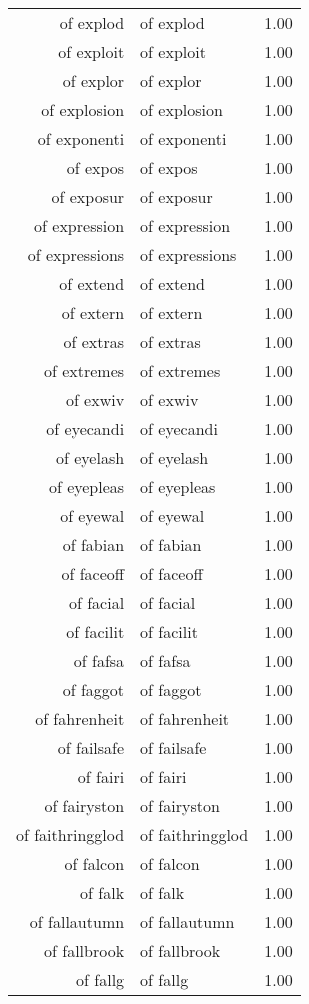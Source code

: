 \begin{table}[ht]
\begin{tabular}{rlr}
  of explod & of explod & 1.00 \\ 
  of exploit & of exploit & 1.00 \\ 
  of explor & of explor & 1.00 \\ 
  of explosion & of explosion & 1.00 \\ 
  of exponenti & of exponenti & 1.00 \\ 
  of expos & of expos & 1.00 \\ 
  of exposur & of exposur & 1.00 \\ 
  of expression & of expression & 1.00 \\ 
  of expressions & of expressions & 1.00 \\ 
  of extend & of extend & 1.00 \\ 
  of extern & of extern & 1.00 \\ 
  of extras & of extras & 1.00 \\ 
  of extremes & of extremes & 1.00 \\ 
  of exwiv & of exwiv & 1.00 \\ 
  of eyecandi & of eyecandi & 1.00 \\ 
  of eyelash & of eyelash & 1.00 \\ 
  of eyepleas & of eyepleas & 1.00 \\ 
  of eyewal & of eyewal & 1.00 \\ 
  of fabian & of fabian & 1.00 \\ 
  of faceoff & of faceoff & 1.00 \\ 
  of facial & of facial & 1.00 \\ 
  of facilit & of facilit & 1.00 \\ 
  of fafsa & of fafsa & 1.00 \\ 
  of faggot & of faggot & 1.00 \\ 
  of fahrenheit & of fahrenheit & 1.00 \\ 
  of failsafe & of failsafe & 1.00 \\ 
  of fairi & of fairi & 1.00 \\ 
  of fairyston & of fairyston & 1.00 \\ 
  of faithringglod & of faithringglod & 1.00 \\ 
  of falcon & of falcon & 1.00 \\ 
  of falk & of falk & 1.00 \\ 
  of fallautumn & of fallautumn & 1.00 \\ 
  of fallbrook & of fallbrook & 1.00 \\ 
  of fallg & of fallg & 1.00 \\ 

\end{tabular}
\end{table}
